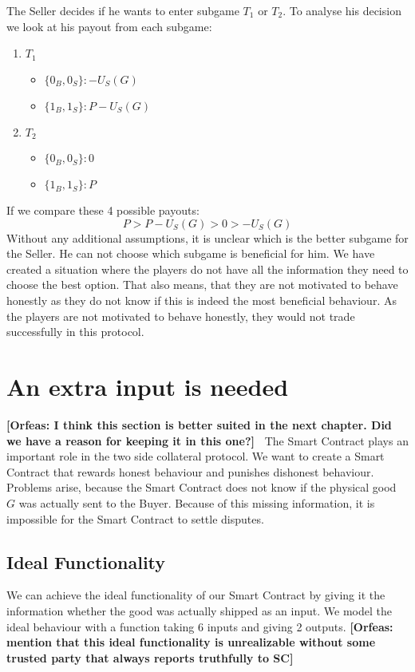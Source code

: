 \documentclass{cacthesis}
\newcommand{\authnote}[3]{{ \footnotesize \textbf{#1[#2: #3]~}}}
\newcommand{\orfnote}[1]{\authnote{\color{blue}}{Orfeas}{#1}}
\begin{document}
The Seller decides if he wants to enter subgame $T_1$ or $T_2$. To analyse his decision we look at his payout from each subgame:\newline
\begin{enumerate}
    \item $T_1$
        \begin{itemize}
            \item $\{0_B, 0_S\}: -U_S(G)$
            \item $\{1_B, 1_S\}: P-U_S(G)$
        \end{itemize}
    \item $T_2$
        \begin{itemize}
            \item $\{0_B, 0_S\}: 0$
            \item $\{1_B, 1_S\}: P$
        \end{itemize}
\end{enumerate}
If we compare these 4 possible payouts:
\[P > P-U_S(G) > 0 > -U_S(G)\]
Without any additional assumptions, it is unclear which is the better subgame for the Seller. He can not choose which subgame is beneficial for him. \newline
We have created a situation where the players do not have all the information they need to choose the best option. That also means, that they are not motivated to behave honestly as they do not know if this is indeed the most beneficial behaviour. As the players are not motivated to behave honestly, they would not trade successfully in this protocol.

\section{An extra input is needed} \orfnote{I think this section is better
suited in the next chapter. Did we have a reason for keeping it in this one?}
The Smart Contract plays an important role in the two side collateral protocol. We want to create a Smart Contract that rewards honest behaviour and punishes dishonest behaviour.\newline 
Problems arise, because the Smart Contract does not know if the physical good $G$ was actually sent to the Buyer. Because of this missing information, it is impossible for the Smart Contract to settle disputes.
\subsection{Ideal Functionality}
We can achieve the ideal functionality of our Smart Contract by giving it the
information whether the good was actually shipped as an input. We model the
ideal behaviour with a function taking 6 inputs and giving 2 outputs.
\orfnote{mention that this ideal functionality is unrealizable without some
trusted party that always reports truthfully to SC}
\end{document}
